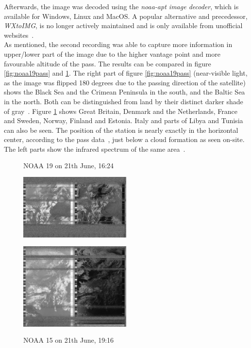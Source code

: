 \documentclass[conference]{IEEEtran}
\begin{document}
Afterwards, the image was decoded using the \textit{noaa-apt image decoder}, which is available for Windows, Linux and MacOS. A popular alternative and precedessor, \textit{WXtoIMG}, is no longer actively maintained and is only available from unofficial websites~\cite{bernardi19noaa-apt}.\\
As mentioned, the second recording was able to capture more information in upper/lower part of the image due to the higher vantage point and more favourable altitude of the pass. The results can be compared in figure \ref{fig:noaa19pass} and \ref{fig:noaa15pass}. The right part of figure \ref{fig:noaa19pass} (near-visible light, as the image was flipped 180 degrees due to the passing direction of the satellite) shows the Black Sea and the Crimean Peninsula in the south, and the Baltic Sea in the north. Both can be distinguished from land by their distinct darker shade of gray~\cite[42p]{NOAA19building}. Figure \ref{fig:noaa15pass} shows Great Britain, Denmark and the Netherlands, France and Sweden, Norway, Finland and Estonia. Italy and parts of Libya and Tunisia can also be seen. The position of the station is nearly exactly in the horizontal center, according to the pass data~\cite{heavensabove19noaa15}, just below a cloud formation as seen on-site.\\
The left parts show the infrared spectrum of the same area~\cite{NOAA19building}.
\begin{figure}
	\centering
	\caption{NOAA 19 on 21th June, 16:24}
	\includegraphics[width=0.5\textwidth]{noaa19_21-06-2019_1624} \label{fig:noaa19pass}
	\caption{NOAA 15 on 21th June, 19:16}
	\includegraphics[width=0.5\textwidth]{noaa15_21-06-2019-1916} \label{fig:noaa15pass}
\end{figure}
\end{document}
